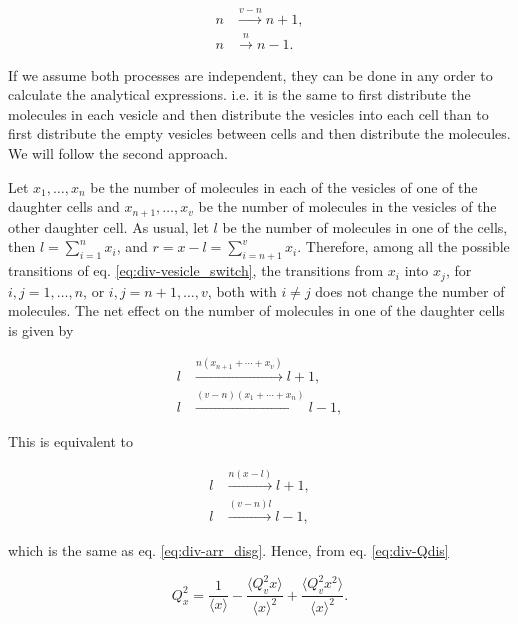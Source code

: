 \begin{equation}
  \label{eq:div-arr_clust}
  \begin{split}
    n &\xrightarrow{v-n} n+1,\\
    n &\xrightarrow{n} n-1.
  \end{split}
\end{equation}

If we assume both processes are independent, they can be done in any order to calculate the analytical expressions. i.e. it is the same to first distribute the molecules in each vesicle and then distribute the vesicles into each cell than to first distribute the empty vesicles between cells and then distribute the molecules. We will follow the second approach.

Let $x_1,\dotsc,x_n$ be the number of molecules in each of the vesicles of one of the daughter cells and $x_{n+1},\dotsc,x_v$ be the number of molecules in the vesicles of the other daughter cell. As usual, let $l$ be the number of molecules in one of the cells, then $l = \sum_{i=1}^nx_i$, and $r = x-l = \sum_{i=n+1}^vx_i$. Therefore, among all the possible transitions of eq. \eqref{eq:div-vesicle_switch}, the transitions from $x_i$ into $x_j$, for $i,j=1,\dotsc,n$, or $i,j=n+1,\dotsc,v$, both with $i\neq j$ does not change the number of molecules. The net effect on the number of molecules in one of the daughter cells is given by

\begin{equation*}
  \begin{split}
    l&\xrightarrow{n(x_{n+1}+\dotsb+x_{v})}l+1,\\
    l&\xrightarrow{(v-n)(x_1+\dotsb+x_n)}l-1,
  \end{split}
\end{equation*}

This is equivalent to

\begin{equation*}
  \begin{split}
    l&\xrightarrow{n(x-l)}l+1,\\
    l&\xrightarrow{(v-n)l}l-1,
  \end{split}
\end{equation*}

which is the same as eq. \eqref{eq:div-arr_disg}. Hence, from eq. \eqref{eq:div-Qdis}

\begin{equation}
  \label{eq:div-clus-Qx1}
  Q_x^2 = \frac{1}{\langle x\rangle} - \frac{\langle Q_v^2x\rangle}{\langle x\rangle^2} + \frac{\langle Q_v^2x^2\rangle}{\langle x\rangle^2}.
\end{equation}


